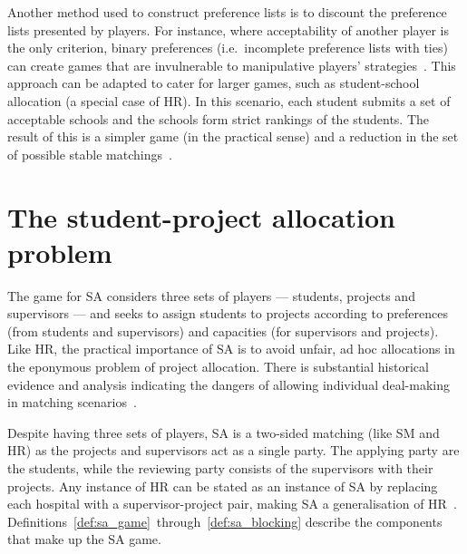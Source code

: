 Another method used to construct preference lists is to discount the preference
lists presented by players. For instance, where acceptability of another player
is the only criterion, binary preferences (i.e.\ incomplete preference lists
with ties) can create games that are invulnerable to manipulative players'
strategies~\cite{Bogomolnaia2004}. This approach can be adapted to cater for
larger games, such as student-school allocation (a special case of HR). In this
scenario, each student submits a set of acceptable schools and the schools form
strict rankings of the students. The result of this is a simpler game (in the
practical sense) and a reduction in the set of possible stable
matchings~\cite{Haeringer2014,Haeringer2019}.


\section{The student-project allocation problem}\label{sec:student_allocation}

The game for SA considers three sets of players --- students, projects and
supervisors --- and seeks to assign students to projects according to
preferences (from students and supervisors) and capacities (for supervisors and
projects). Like HR, the practical importance of SA is to avoid unfair, ad hoc
allocations in the eponymous problem of project allocation. There is substantial
historical evidence and analysis indicating the dangers of allowing individual
deal-making in matching scenarios~\cite{Gusfield1989,Roth1984,Roth1992}.

Despite having three sets of players, SA is a two-sided matching (like SM and
HR) as the projects and supervisors act as a single party. The applying party
are the students, while the reviewing party consists of the supervisors with
their projects. Any instance of HR can be stated as an instance of SA by
replacing each hospital with a supervisor-project pair, making SA a
generalisation of HR~\cite{Abraham2003}.
Definitions~\ref{def:sa_game}~through~\ref{def:sa_blocking} describe the
components that make up the SA game.

